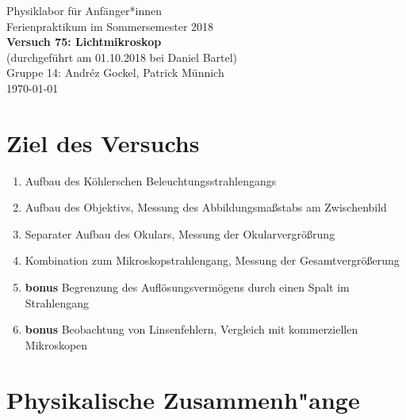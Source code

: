 \documentclass[11pt,a4paper]{article}
\begin{document}
{
\centering 
\large 
Physiklabor für Anf\"anger*innen \\
Ferienpraktikum im Sommersemester 2018 \\[4mm]
\textbf{\LARGE 
Versuch 75: Lichtmikroskop
} \\[3mm]
(durchgef\"uhrt am 01.10.2018 bei Daniel Bartel) \\
Gruppe 14: Andréz Gockel, Patrick M\"unnich\\
\today \\[10mm]
}

\vspace{50pt}
\tableofcontents
\vspace{22pt}

\pagebreak

\section{Ziel des Versuchs}

\begin{enumerate}
\item Aufbau des Köhlerschen Beleuchtungsstrahlengangs
\item Aufbau des Objektivs, Messung des Abbildungsma\ss stabs am Zwischenbild
\item Separater Aufbau des Okulars, Messung der Okularvergr\"o\ss rung
\item Kombination zum Mikroskopstrahlengang, Messung der Gesamtvergr\"o\ss erung 
\item \textbf{bonus} Begrenzung des Aufl\"osungsverm\"ogens durch einen Spalt im Strahlengang 
\item \textbf{bonus} Beobachtung von Linsenfehlern, Vergleich mit kommerziellen Mikroskopen
\end{enumerate}


\section{Physikalische Zusammenh"ange}
\end{document}
